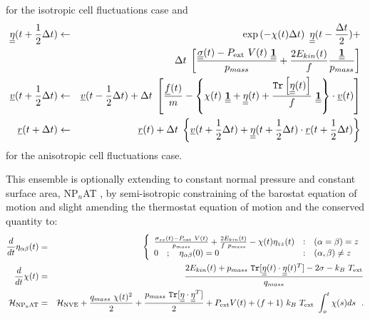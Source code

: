 for the isotropic cell fluctuations case and
\begin{eqnarray}
\mbox{$\underline{\underline{\bf \eta}}$}(t + {1 \over 2} \Delta t) &\leftarrow& \exp \left( -\chi (t) \Delta t \right) ~ \mbox{$\underline{\underline{\bf \eta}}$}(t - {\Delta t \over 2}) + \nonumber \\
&& \Delta t \; \left[ \frac{\mbox{$\underline{\underline{\bf \sigma}}$}(t) - P_{\rm ext}~V(t)~\mbox{$\underline{\underline{\bf 1}}$}}{p_{mass}} +
\frac{2 E_{kin}(t)}{f} \frac{\mbox{$\underline{\underline{\bf 1}}$}}{p_{mass}} \right] \nonumber \\
\mbox{$\underline{v}$}(t + {1 \over 2} \Delta t) &\leftarrow& \mbox{$\underline{v}$}(t - {1 \over 2} \Delta t) + \Delta t \;
\left[{\mbox{$\underline{f}$}(t) \over m} - \left\{ \chi(t)~\mbox{$\underline{\underline{\bf 1}}$} +
\mbox{$\underline{\underline{\bf \eta}}$}(t) + \frac{{\tt Tr}\left[\mbox{$\underline{\underline{\bf \eta}}$}(t)\right]}{f}~\mbox{$\underline{\underline{\bf 1}}$} \right\} \cdot \mbox{$\underline{v}$}(t) \right] \\
\mbox{$\underline{r}$}(t + \Delta t) &\leftarrow& \mbox{$\underline{r}$}(t) + \Delta t \;
\left\{ \mbox{$\underline{v}$}(t + {1 \over 2} \Delta t) + \mbox{$\underline{\underline{\bf \eta}}$} (t + {1 \over 2} \Delta t) \cdot
\mbox{$\underline{r}$}(t + {1 \over 2} \Delta t) \right\} \nonumber
\end{eqnarray}
for the anisotropic cell fluctuations case.

This ensemble is optionally extending to constant normal pressure
and constant surface area, NP$_{n}$AT \cite{ikeguchi-04a}, by semi-isotropic
constraining of the barostat equation of motion and slight amending
the thermostat equation of motion and the conserved quantity to:
\begin{eqnarray}
\frac{d}{dt} \eta_{\alpha\beta}(t) &=& \left\{ \begin{array} {l@{\quad:\quad}l}
\frac{\sigma_{zz}(t) - P_{\rm ext}~V(t)}{p_{mass}} + \frac{2 E_{kin}(t)}{f~p_{mass}} -
\chi(t) \eta_{zz}(t) & (\alpha = \beta) = z \\
0~~~;~~~\eta_{\alpha\beta}(0) = 0 & (\alpha,\beta) \ne z
\end{array} \right. \nonumber \\
\frac{d}{dt} \chi(t) &=& \frac{2 E_{kin}(t) + p_{mass}~{\tt Tr}[\mat{\eta}(t) \cdot
\mat{\eta}(t)^{T}] - 2 \sigma - k_{B}~T_{\rm ext}}{q_{mass}} \\
{\cal H}_{\rm NP_{n}AT} &=& {\cal H}_{\rm NVE} + {q_{mass}~\chi (t)^{2} \over 2} +
{p_{mass}~{\tt Tr}[\mat{\eta} \cdot \mat{\eta}^{T}] \over 2} + P_{\rm ext} V(t) +
(f+1)~k_{B}~T_{\rm ext}~\int_o^t \chi (s) ds~~. \nonumber
\end{eqnarray}

